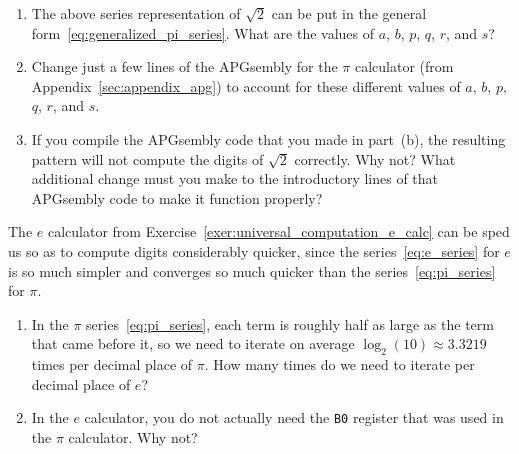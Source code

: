 \begin{multicols}{2}
\begin{problem}
		\begin{enumerate}[label=\bf\color{ocre}(\alph*)]
			\item {} The above series representation of $\sqrt{2}$ can be put in the general form~\eqref{eq:generalized_pi_series}. What are the values of $a$, $b$, $p$, $q$, $r$, and $s$?
			
			\item {} Change just a few lines of the APGsembly for the $\pi$ calculator (from Appendix~\ref{sec:appendix_apg}) to account for these different values of $a$, $b$, $p$, $q$, $r$, and $s$.
			
			\item {} If you compile the APGsembly code that you made in part~(b), the resulting pattern will not compute the digits of $\sqrt{2}$ correctly. Why not? What additional change must you make to the introductory lines of that APGsembly code to make it function properly?
		\end{enumerate}
	\end{problem}
	
	
	\mfilbreak
	
	
	\begin{problem}\label{exer:universal_computation_fast_e_calc} 
		The $e$ calculator from Exercise~\ref{exer:universal_computation_e_calc} can be sped us so as to compute digits considerably quicker, since the series~\eqref{eq:e_series} for $e$ is so much simpler and converges so much quicker than the series~\eqref{eq:pi_series} for $\pi$.\smallskip
		
		\begin{enumerate}[label=\bf\color{ocre}(\alph*)]
			\item In the $\pi$ series~\eqref{eq:pi_series}, each term is roughly half as large as the term that came before it, so we need to iterate on average $\log_2(10) \approx 3.3219$ times per decimal place of $\pi$. How many times do we need to iterate per decimal place of $e$?
			
			\item In the $e$ calculator, you do not actually need the \texttt{B0} register that was used in the $\pi$ calculator. Why not?
			

\end{enumerate}
\end{problem}
\end{multicols}
